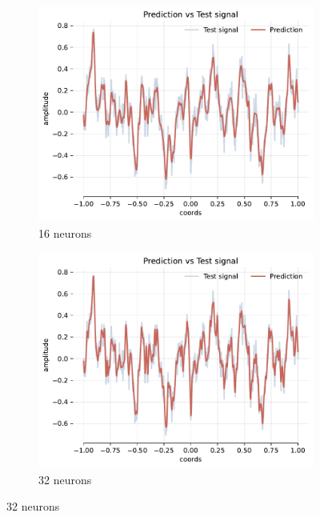 \begin{figure}[!h]
    \centering
    \begin{subfigure}[b]{0.32\textwidth}
        \centering
        \includegraphics[width=\textwidth]{img/ch3/pred-noise-1hl-16hf-w8.pdf}
        \caption{16 neurons}
        \label{fig:pred-noise-1hl-16hf-w8}
    \end{subfigure}
    \begin{subfigure}[b]{0.32\textwidth}
        \centering
        \includegraphics[width=\textwidth]{img/ch3/pred-noise-1hl-32hf-w8.pdf}
        \caption{32 neurons}
        \label{fig:comp-pred-noise-1hl-32hf-w8}
    \end{subfigure}

\end{figure}
